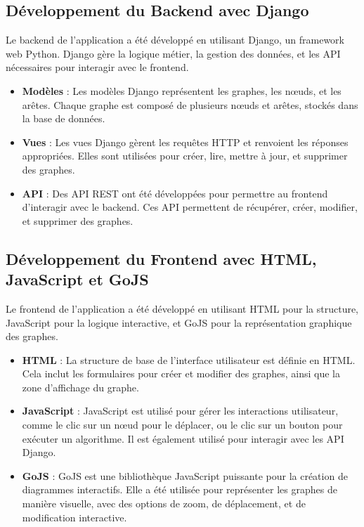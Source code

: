 \documentclass[a4paper,12pt]{article}
\begin{document}
\subsection{Développement du Backend avec Django}
Le backend de l'application a été développé en utilisant Django, un framework web Python. Django gère la logique métier, la gestion des données, et les API nécessaires pour interagir avec le frontend.

\begin{itemize}
    \item \textbf{Modèles} : Les modèles Django représentent les graphes, les nœuds, et les arêtes. Chaque graphe est composé de plusieurs nœuds et arêtes, stockés dans la base de données.
    \item \textbf{Vues} : Les vues Django gèrent les requêtes HTTP et renvoient les réponses appropriées. Elles sont utilisées pour créer, lire, mettre à jour, et supprimer des graphes.
    \item \textbf{API} : Des API REST ont été développées pour permettre au frontend d'interagir avec le backend. Ces API permettent de récupérer, créer, modifier, et supprimer des graphes.
\end{itemize}

\subsection{Développement du Frontend avec HTML, JavaScript et GoJS}
Le frontend de l'application a été développé en utilisant HTML pour la structure, JavaScript pour la logique interactive, et GoJS pour la représentation graphique des graphes.

\begin{itemize}
    \item \textbf{HTML} : La structure de base de l'interface utilisateur est définie en HTML. Cela inclut les formulaires pour créer et modifier des graphes, ainsi que la zone d'affichage du graphe.
    \item \textbf{JavaScript} : JavaScript est utilisé pour gérer les interactions utilisateur, comme le clic sur un nœud pour le déplacer, ou le clic sur un bouton pour exécuter un algorithme. Il est également utilisé pour interagir avec les API Django.
    \item \textbf{GoJS} : GoJS est une bibliothèque JavaScript puissante pour la création de diagrammes interactifs. Elle a été utilisée pour représenter les graphes de manière visuelle, avec des options de zoom, de déplacement, et de modification interactive.
\end{itemize}
\end{document}
